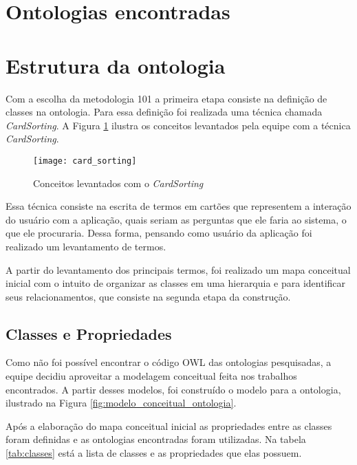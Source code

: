   \vfill
  \pagebreak
  \section{Ontologias encontradas}
   
      
      
  \vfill
  \pagebreak
  \section{Estrutura da ontologia}

      Com a escolha da metodologia 101 a primeira etapa consiste na definição de classes na ontologia.
      Para essa definição foi realizada uma técnica chamada \textit{CardSorting}. A Figura \ref{fig:card_sorting} 
      ilustra os conceitos levantados pela equipe com a técnica \textit{CardSorting}.
      
      \begin{figure}[!htb]
	\centering
	\texttt{[image: card\_sorting]}
	\caption[Conceitos levantados com o \textit{CardSorting}]{Conceitos levantados com o \textit{CardSorting}}
	\label{fig:card_sorting}
      \end{figure}
      
      Essa técnica consiste na escrita de termos em cartões que representem a interação do usuário com a aplicação,
      quais seriam as perguntas que ele faria ao sistema, o que ele procuraria. Dessa forma, pensando como usuário
      da aplicação foi realizado um levantamento de termos.

      A partir do levantamento dos principais termos, foi realizado um mapa conceitual inicial com o intuito
      de organizar as classes em uma hierarquia e para identificar seus relacionamentos, que consiste na segunda
      etapa da construção.

      \subsection{Classes e Propriedades}
      
	  Como não foi possível encontrar o código OWL das ontologias pesquisadas, a equipe decidiu aproveitar a
	  modelagem conceitual feita nos trabalhos encontrados. A partir desses modelos, foi construído o modelo 
	  para a ontologia, ilustrado na Figura \ref{fig:modelo_conceitual_ontologia}.
	  
	  Após a elaboração do mapa conceitual inicial as propriedades entre as classes foram definidas e as ontologias
	  encontradas foram utilizadas. 
	  Na tabela \ref{tab:classes} está a lista de classes e as propriedades que elas possuem.      

